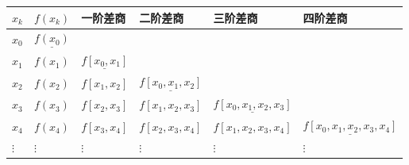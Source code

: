 \documentclass[
  10pt,
  fontset=fandol]{ctexart}
\newcounter{none} %
\begin{document}
{\def\LTcaptype{none} %
\begin{longtable}[]{@{}
  >{\raggedright\arraybackslash}p{}
  >{\raggedright\arraybackslash}p{}
  >{\raggedright\arraybackslash}p{}
  >{\raggedright\arraybackslash}p{}
  >{\raggedright\arraybackslash}p{}
  >{\raggedright\arraybackslash}p{}@{}}
\toprule\noalign{}
\begin{minipage}[b]{\linewidth}\raggedright
\(x_k\)
\end{minipage} & \begin{minipage}[b]{\linewidth}\raggedright
\(f(x_k)\)
\end{minipage} & \begin{minipage}[b]{\linewidth}\raggedright
一阶差商
\end{minipage} & \begin{minipage}[b]{\linewidth}\raggedright
二阶差商
\end{minipage} & \begin{minipage}[b]{\linewidth}\raggedright
三阶差商
\end{minipage} & \begin{minipage}[b]{\linewidth}\raggedright
四阶差商
\end{minipage} \\
\midrule\noalign{}
\endhead
\bottomrule\noalign{}
\endlastfoot
\(x_0\) & \(\underline{f(x_0)}\) & & & & \\
\(x_1\) & \(f(x_1)\) & \(\underline{f[x_0,x_1]}\) & & & \\
\(x_2\) & \(f(x_2)\) & \(f[x_1,x_2]\) & \(\underline{f[x_0,x_1,x_2]}\) & & \\
\(x_3\) & \(f(x_3)\) & \(f[x_2,x_3]\) & \(f[x_1,x_2,x_3]\) & \(\underline{f[x_0,x_1,x_2,x_3]}\) & \\
\(x_4\) & \(f(x_4)\) & \(f[x_3,x_4]\) & \(f[x_2,x_3,x_4]\) & \(f[x_1,x_2,x_3,x_4]\) & \(\underline{f[x_0,x_1,x_2,x_3,x_4]}\) \\
\(\vdots\) & \(\vdots\) & \(\vdots\) & \(\vdots\) & \(\vdots\) & \(\vdots\) \\
\end{longtable}
}
\end{document}
